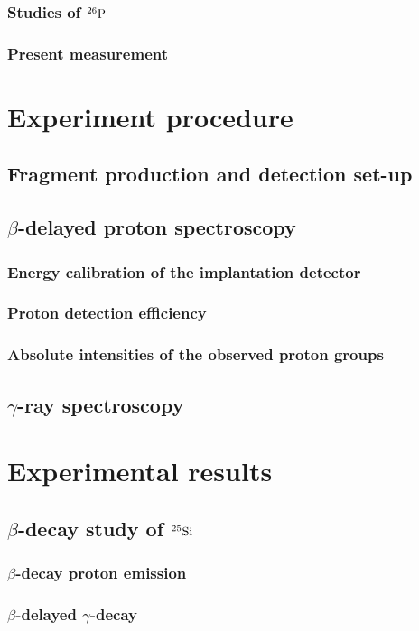 \documentclass[UTF8]{ctexart}
\begin{document}
\subsubsection{Studies of $^{26}\textnormal{P}$}
\subsubsection{Present measurement}
\section{Experiment procedure}
\subsection{Fragment production and detection set-up}
\subsection{$\beta$-delayed proton spectroscopy}
\subsubsection{Energy calibration of the implantation detector}
\subsubsection{Proton detection efficiency}
\subsubsection{Absolute intensities of the observed proton groups}
\subsection{$\gamma$-ray spectroscopy}
\section{Experimental results}
\subsection{$\beta$-decay study of $^{25}\textnormal{Si}$}
\subsubsection{$\beta$-decay proton emission}
\subsubsection{$\beta$-delayed $\gamma$-decay}
\end{document}
